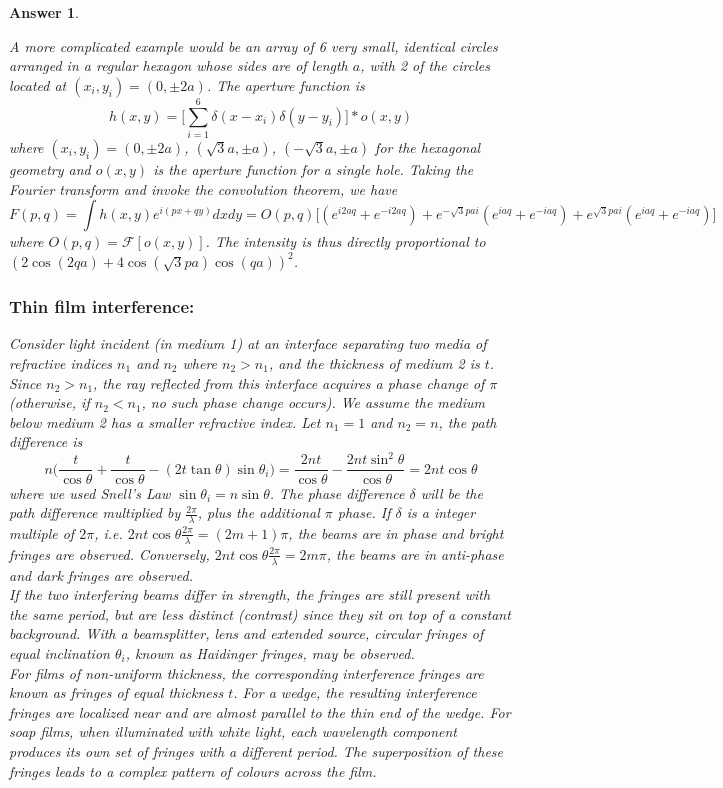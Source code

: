 \documentclass[a4paper]{article}
\newtheorem{ans}{Answer}[subsection]
\theoremstyle{new}
\begin{document}
\begin{ans}
\begin{figure}[H]
\end{figure}
A more complicated example would be an array of 6 very small, identical circles arranged in a regular hexagon whose sides are of length $a$, with 2 of the circles located at $(x_i, y_i) = (0,\pm 2a)$. The aperture function is
$$h(x,y)=\bigg[\sum_{i=1}^6\delta(x-x_i)\delta(y-y_i)\bigg]*o(x,y)$$
where $(x_i,y_i)=(0,\pm2a)$, $(\sqrt{3}a,\pm a)$, $(-\sqrt{3}a,\pm a)$ for the hexagonal geometry and $o(x,y)$ is the aperture function for a single hole. Taking the Fourier transform and invoke the convolution theorem, we have
$$F(p,q)=\int h(x,y)e^{i(px+qy)}dxdy=O(p,q)\bigg[(e^{i2aq}+e^{-i2aq})+e^{-\sqrt{3}pai}(e^{iaq}+e^{-iaq})+e^{\sqrt{3}pai}(e^{iaq}+e^{-iaq})\bigg]$$
where $O(p,q)=\mathcal{F}[o(x,y)]$. The intensity is thus directly proportional to $(2\cos(2qa)+4\cos(\sqrt{3}pa)\cos(qa))^2$.
\newpage
\subsubsection*{Thin film interference:}
Consider light incident (in medium 1) at an interface separating two media of refractive indices $n_1$ and $n_2$ where $n_2>n_1$, and the thickness of medium 2 is $t$. Since $n_2>n_1$, the ray reflected from this interface acquires a phase change of $\pi$ (otherwise, if $n_2<n_1$, no such phase change occurs). We assume the medium below medium 2 has a smaller refractive index. Let $n_1=1$ and $n_2=n$, the path difference is
$$n\bigg(\frac{t}{\cos\theta}+\frac{t}{\cos\theta}-(2t\tan\theta)\sin\theta_i\bigg)=\frac{2nt}{\cos\theta}-\frac{2nt\sin^2\theta}{\cos\theta}=2nt\cos\theta$$
where we used Snell's Law $\sin\theta_i=n\sin\theta$. The phase difference $\delta$ will be the path difference multiplied by $\frac{2\pi}{\lambda}$, plus the additional $\pi$ phase. If $\delta$ is a integer multiple of $2\pi$, i.e. $2nt\cos\theta\frac{2\pi}{\lambda}=(2m+1)\pi$, the beams are in phase and bright fringes are observed. Conversely, $2nt\cos\theta\frac{2\pi}{\lambda}=2m\pi$, the beams are in anti-phase and dark fringes are observed. \\[5pt]
If the two interfering beams differ in strength, the fringes are still present with the same period, but are less distinct (contrast) since they sit on top of a constant background. With a beamsplitter, lens and extended source, circular fringes of equal inclination $\theta_i$, known as Haidinger fringes, may be observed.\\[5pt]
For films of non-uniform thickness, the corresponding interference fringes are known as fringes of equal thickness $t$. For a wedge, the resulting interference fringes are localized near and are almost parallel to the thin end of the wedge. For soap films, when illuminated with white light, each wavelength component produces its own set of fringes with a different period. The superposition of these fringes leads to a complex pattern of colours across the film.

\end{ans}
\end{document}
